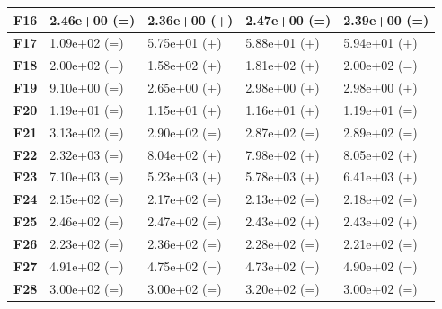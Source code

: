 \documentclass[12pt,a4paper]{report}
\begin{document}
{{{{{{{\begin{table}[h]
\begin{tabular}{|l|l|l|l|l|}
{\bf F16} & 2.46e+00 (=)        & 2.36e+00 (+)     & 2.47e+00 (=)      & 2.39e+00 (=)      \\ \hline
{\bf F17} & 1.09e+02 (=)        & 5.75e+01 (+)     & 5.88e+01 (+)      & 5.94e+01 (+)      \\ \hline
{\bf F18} & 2.00e+02 (=)        & 1.58e+02 (+)     & 1.81e+02 (+)      & 2.00e+02 (=)      \\ \hline
{\bf F19} & 9.10e+00 (=)        & 2.65e+00 (+)     & 2.98e+00 (+)      & 2.98e+00 (+)      \\ \hline
{\bf F20} & 1.19e+01 (=)        & 1.15e+01 (+)     & 1.16e+01 (+)      & 1.19e+01 (=)      \\ \hline
{\bf F21} & 3.13e+02 (=)        & 2.90e+02 (=)     & 2.87e+02 (=)      & 2.89e+02 (=)      \\ \hline
{\bf F22} & 2.32e+03 (=)        & 8.04e+02 (+)     & 7.98e+02 (+)      & 8.05e+02 (+)      \\ \hline
{\bf F23} & 7.10e+03 (=)        & 5.23e+03 (+)     & 5.78e+03 (+)      & 6.41e+03 (+)      \\ \hline
{\bf F24} & 2.15e+02 (=)        & 2.17e+02 (=)     & 2.13e+02 (=)      & 2.18e+02 (=)      \\ \hline
{\bf F25} & 2.46e+02 (=)        & 2.47e+02 (=)     & 2.43e+02 (+)      & 2.43e+02 (+)      \\ \hline
{\bf F26} & 2.23e+02 (=)        & 2.36e+02 (=)     & 2.28e+02 (=)      & 2.21e+02 (=)      \\ \hline
{\bf F27} & 4.91e+02 (=)        & 4.75e+02 (=)     & 4.73e+02 (=)      & 4.90e+02 (=)      \\ \hline
{\bf F28} & 3.00e+02 (=)        & 3.00e+02 (=)     & 3.20e+02 (=)      & 3.00e+02 (=)      \\ \hline
\end{tabular}
\end{table}



}}}}}}}
\end{document}
